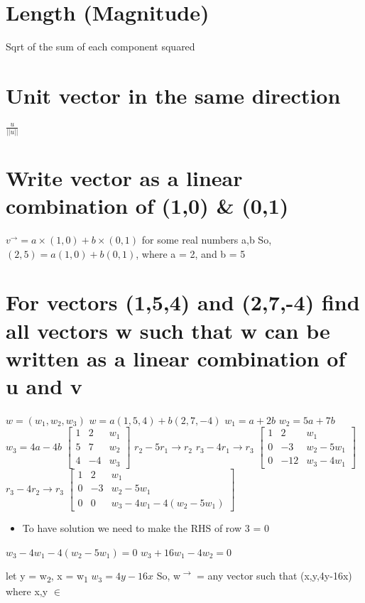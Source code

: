 \documentclass[11pt]{article}
\begin{document}
\section{Length (Magnitude)}
\label{sec:org389a8d4}
Sqrt of the sum of each component squared
\section{Unit vector in the same direction}
\label{sec:org378ad29}
\(\frac{u}{||u||}\)
\section{Write vector as a linear combination of (1,0) \& (0,1)}
\label{sec:org1c8abfc}
\(v^{\rightarrow{}} = a \times (1,0) + b \times (0,1)\) for some real numbers a,b
So, \((2,5) = a(1,0) + b(0,1)\), where a = 2, and b = 5
\section{For vectors (1,5,4) and (2,7,-4) find all vectors w such that w can be written as a linear combination of u and v}
\label{sec:orgddf59c8}
\(w = (w_{1},w_{2},w_{3})\)
\(w = a(1,5,4) + b(2,7,-4)\)
\(w_{1} = a+2b\)
\(w_{2} = 5a+7b\)
\(w_{3} = 4a-4b\)
\(\begin{bmatrix}1&2&w_{1}\\5&7&w_{2}\\4&-4&w_{3}\end{bmatrix}\)
\(r_{2}-5r_{1} \rightarrow{} r_{2}\)
\(r_{3}-4r_{1} \rightarrow r_{3}\)
\(\begin{bmatrix}1&2&w_{1}\\0&-3&w_{2}-5w_{1}\\0&-12&w_{3}-4w_{1}\end{bmatrix}\)
\(r_{3}-4r_{2}\rightarrow{}r_{3}\)
\(\begin{bmatrix}1&2&w_{1}\\0&-3&w_{2}-5w_{1}\\0&0&w_{3}-4w_{1}-4(w_{2}-5w_{1})\end{bmatrix}\)
\begin{itemize}
\item To have solution we need to make the RHS of row 3 = 0
\end{itemize}
\(w_{3}-4w_{1}-4(w_{2}-5w_{1}) = 0\)
\(w_{3}+16w_{1}-4w_{2} = 0\)

let y = w\textsubscript{2}, x = w\textsubscript{1}
\(w_{3} = 4y - 16x\)
So, w\textsuperscript{\(\rightarrow\)} = any vector such that (x,y,4y-16x) where x,y \(\in\) 
\end{document}
